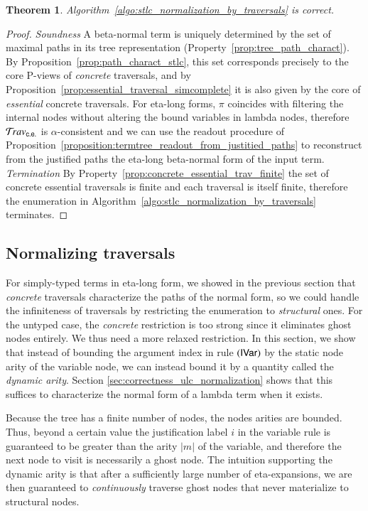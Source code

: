 \documentclass{elsarticle}
\newif\iflongversion
\theoremstyle{plain}
\newtheorem{theorem}{Theorem}[section]
\theoremstyle{definition}
\newcommand{\ghostvar}{\mathsf{x\mkern-5mu x}}
\newcommand{\concreteessential}{{\sf c.e.}}
\newcommand{\travsetcones}{\travset_\concreteessential} %
\def\coresymbol{\pi} %
\begin{document}
\begin{theorem}
Algorithm~\ref{algo:stlc_normalization_by_traversals} is correct.
\end{theorem}
\begin{proof}
\emph{Soundness} A beta-normal term is uniquely determined by the set of maximal paths in its tree representation (Property~\ref{prop:tree_path_charact}).
By Proposition~\ref{prop:path_charact_stlc}, this set corresponds precisely to the core P-views of \emph{concrete} traversals,
and by Proposition~\ref{prop:essential_traversal_simcomplete} it is also given by the core of \emph{essential} concrete traversals.
For eta-long forms, $\coresymbol$ coincides with filtering the internal nodes without altering the bound variables in lambda nodes, therefore $\travsetcones$ is $\alpha$-consistent and we can use the
readout procedure of Proposition~\ref{proposition:termtree_readout_from_justitied_paths} to reconstruct
from the justified paths the
eta-long beta-normal form of the input term.
%
\emph{Termination} By Property~\ref{prop:concrete_essential_trav_finite} the set of concrete essential traversals is finite and each traversal is itself finite, therefore the enumeration in Algorithm~\ref{algo:stlc_normalization_by_traversals} terminates.
\end{proof}

\subsection{Normalizing traversals}

For simply-typed terms in eta-long form,
we showed in the previous section that \emph{concrete} traversals
characterize the paths of the normal form,
so we could handle the infiniteness of traversals
by restricting the enumeration to \emph{structural} ones.
For the untyped case, the \emph{concrete} restriction
is too strong since it eliminates ghost nodes entirely. We thus need a more relaxed restriction.
In this section, we show that instead of bounding
the argument index in rule $\mathbf{({\sf IVar})}$ by the static node arity of the variable node, we can instead bound it by
a quantity called the \emph{dynamic arity}.
Section \ref{sec:correctness_ulc_normalization} shows that this suffices to characterize the normal form of a lambda term when it exists.

Because the tree has a finite number of nodes, the nodes arities are bounded. Thus, beyond a certain value the
justification label $i$ in the variable rule
  is guaranteed to be greater than the arity $|m|$ of the variable, and therefore the next node to visit is necessarily a ghost node. The intuition supporting the dynamic arity is that after a sufficiently large number of eta-expansions, we are then guaranteed to \emph{continuously} traverse ghost nodes that never materialize to structural nodes.
\iflongversion
 In other words, any further extension will necessarily be constructed using repeated applications of \rulenamet{Lam^\ghostvar} and the eta-expanded variants of \rulenamet{Var}, and will thus consists only of ghost occurrences.
\fi
\end{document}
